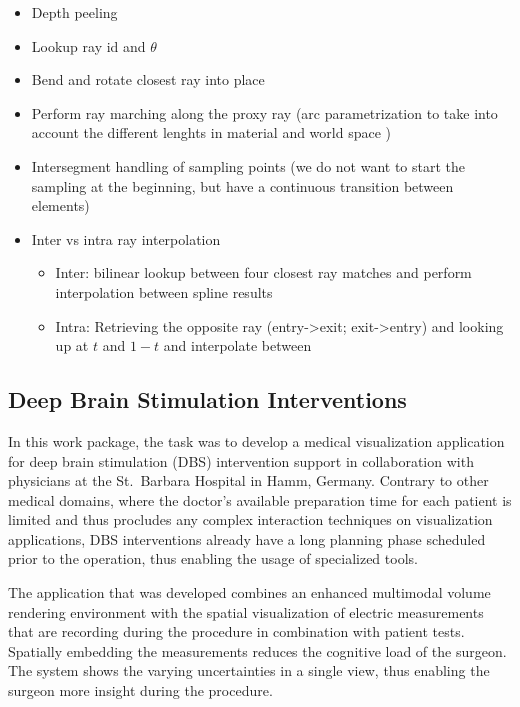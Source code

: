 \begin{itemize}
\begin{itemize}
    \item Depth peeling \cite{mammen89DepthPeeling}
    \item Lookup ray id and $\theta$
    \item Bend and rotate closest ray into place
    \item Perform ray marching along the proxy ray (arc parametrization to take into account the different lenghts in material and world space \cite{guenter90arclength})
    \item Intersegment handling of sampling points (we do not want to start the sampling at the beginning, but have a continuous transition between elements)
    \item Inter vs intra ray interpolation
    \begin{itemize}
        \item Inter: bilinear lookup between four closest ray matches and perform interpolation between spline results
        \item Intra: Retrieving the opposite ray (entry->exit; exit->entry) and looking up at $t$ and $1-t$ and interpolate between
    \end{itemize}
\end{itemize}

\end{itemize}

\subsection{Deep Brain Stimulation Interventions}
\label{contributions:medbio:dbs}
In this work package, the task was to develop a medical visualization application for deep brain stimulation (DBS) intervention support in collaboration with physicians at the St.~Barbara Hospital in Hamm, Germany. Contrary to other medical domains, where the doctor's available preparation time for each patient is limited  and thus procludes any complex interaction techniques on visualization applications, DBS interventions already have a long planning phase scheduled prior to the operation, thus enabling the usage of specialized tools.

The application that was developed combines an enhanced multimodal  volume rendering environment with the spatial visualization of electric measurements that are recording during the procedure in combination with patient tests. Spatially embedding the measurements reduces the cognitive load of the surgeon. The system shows the varying uncertainties in a single view, thus enabling the surgeon more insight during the procedure.

